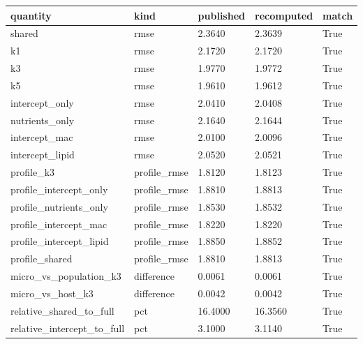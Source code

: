 {\footnotesize\setlength{\tabcolsep}{3pt}
\begin{longtable}{lllll}
\toprule
\textbf{quantity} & \textbf{kind} & \textbf{published} & \textbf{recomputed} & \textbf{match} \\
\midrule
\endhead
shared & rmse & 2.3640 & 2.3639 & True \\
k1 & rmse & 2.1720 & 2.1720 & True \\
k3 & rmse & 1.9770 & 1.9772 & True \\
k5 & rmse & 1.9610 & 1.9612 & True \\
intercept\_only & rmse & 2.0410 & 2.0408 & True \\
nutrients\_only & rmse & 2.1640 & 2.1644 & True \\
intercept\_mac & rmse & 2.0100 & 2.0096 & True \\
intercept\_lipid & rmse & 2.0520 & 2.0521 & True \\
profile\_k3 & profile\_rmse & 1.8120 & 1.8123 & True \\
profile\_intercept\_only & profile\_rmse & 1.8810 & 1.8813 & True \\
profile\_nutrients\_only & profile\_rmse & 1.8530 & 1.8532 & True \\
profile\_intercept\_mac & profile\_rmse & 1.8220 & 1.8220 & True \\
profile\_intercept\_lipid & profile\_rmse & 1.8850 & 1.8852 & True \\
profile\_shared & profile\_rmse & 1.8810 & 1.8813 & True \\
micro\_vs\_population\_k3 & difference & 0.0061 & 0.0061 & True \\
micro\_vs\_host\_k3 & difference & 0.0042 & 0.0042 & True \\
relative\_shared\_to\_full & pct & 16.4000 & 16.3560 & True \\
relative\_intercept\_to\_full & pct & 3.1000 & 3.1140 & True \\
\bottomrule
\end{longtable}}
